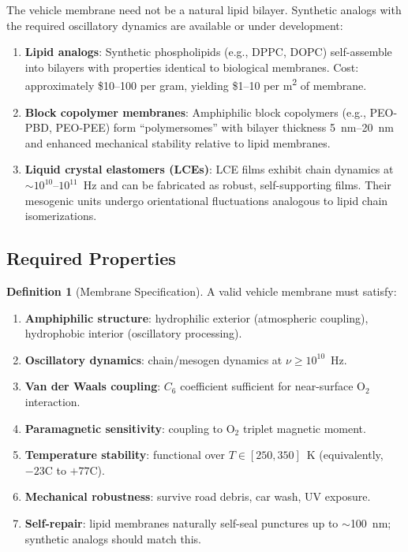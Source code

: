 \documentclass[12pt]{article}
\theoremstyle{definition}
\newtheorem{definition}[theorem]{Definition}
\theoremstyle{remark}
\begin{document}
The vehicle membrane need not be a natural lipid bilayer. Synthetic analogs with the required oscillatory dynamics are available or under development:

\begin{enumerate}[label=(\roman*)]
  \item \textbf{Lipid analogs}: Synthetic phospholipids (e.g., DPPC, DOPC) self-assemble into bilayers with properties identical to biological membranes. Cost: approximately \$10--100 per gram, yielding \$1--10 per \si{m^2} of membrane.

  \item \textbf{Block copolymer membranes}: Amphiphilic block copolymers (e.g., PEO-PBD, PEO-PEE) form ``polymersomes'' with bilayer thickness \SI{5}{\nm}--\SI{20}{\nm} and enhanced mechanical stability relative to lipid membranes.

  \item \textbf{Liquid crystal elastomers (LCEs)}: LCE films exhibit chain dynamics at $\sim 10^{10}$--$10^{11}$~Hz and can be fabricated as robust, self-supporting films. Their mesogenic units undergo orientational fluctuations analogous to lipid chain isomerizations.
\end{enumerate}

\subsection{Required Properties}

\begin{definition}[Membrane Specification]
\label{def:membrane_spec}
A valid vehicle membrane must satisfy:
\begin{enumerate}[label=(\alph*)]
  \item \textbf{Amphiphilic structure}: hydrophilic exterior (atmospheric coupling), hydrophobic interior (oscillatory processing).
  \item \textbf{Oscillatory dynamics}: chain/mesogen dynamics at $\nu \geq 10^{10}$~Hz.
  \item \textbf{Van der Waals coupling}: $C_6$ coefficient sufficient for near-surface $\mathrm{O}_2$ interaction.
  \item \textbf{Paramagnetic sensitivity}: coupling to $\mathrm{O}_2$ triplet magnetic moment.
  \item \textbf{Temperature stability}: functional over $T \in [250, 350]$~K (equivalently, $-23$\textdegree C to $+77$\textdegree C).
  \item \textbf{Mechanical robustness}: survive road debris, car wash, UV exposure.
  \item \textbf{Self-repair}: lipid membranes naturally self-seal punctures up to $\sim$\SI{100}{nm}; synthetic analogs should match this.
\end{enumerate}
\end{definition}
\end{document}
